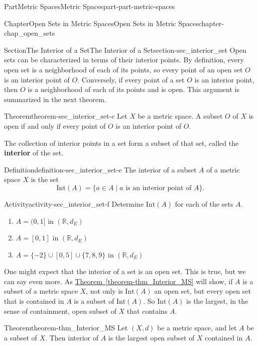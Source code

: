 \documentclass[oneside,10pt,]{book}
\newcommand{\xreffont}{\relax}
\newcommand{\terminology}[1]{\textbf{#1}}
\numberwithin{equation}{chapter}
\newcommand{\R}{\mathbb{R}}
\newcommand{\Int}{\text{Int}}
\begin{document}
\begin{partptx}{Part}{Metric Spaces}{}{Metric Spaces}{}{}{part-part-metric-spaces}
\begin{chapterptx}{Chapter}{Open Sets in Metric Spaces}{}{Open Sets in Metric Spaces}{}{}{chapter-chap_open_sets}
\begin{sectionptx}{Section}{The Interior of a Set}{}{The Interior of a Set}{}{}{section-sec_interior_set}
Open sets can be characterized in terms of their interior points. By definition, every open set is a neighborhood of each of its points, so every point of an open set \(O\) is an interior point of \(O\). Conversely, if every point of a set \(O\) is an interior point, then \(O\) is a neighborhood of each of its points and is open. This argument is summarized in the next theorem.%
\begin{theorem}{Theorem}{}{}{theorem-sec_interior_set-c}%
Let \(X\) be a metric space. A subset \(O\) of \(X\) is open if and only if every point of \(O\) is an interior point of \(O\).%
\end{theorem}
The collection of interior points in a set form a subset of that set, called the \terminology{interior} of the set.%
\begin{definition}{Definition}{}{definition-sec_interior_set-e}%
The interior  of a subset \(A\) of a metric space \(X\) is the set%
\begin{equation*}
\Int(A) = \{a \in A \mid a \text{ is an interior point of }  A\}\text{.}
\end{equation*}
%
\end{definition}
\begin{activity}{Activity}{}{activity-sec_interior_set-f}%
Determine \(\Int(A)\) for each of the sets \(A\).%
\begin{enumerate}[font=\bfseries,label=(\alph*),ref=\alph*]%
\item{}\(A = (0,1]\) in \((\R, d_E)\)%
\item{}\(A = [0,1]\) in \((\R, d_E)\)%
\item{}\(A = \{-2\} \cup [0,5] \cup \{7,8,9\}\) in \((\R,d_E)\)%
\end{enumerate}%
\end{activity}%
One might expect that the interior of a set is an open set. This is true, but we can say even more. As \hyperref[theorem-thm_Interior_MS]{Theorem~{\xreffont\ref{theorem-thm_Interior_MS}}} will show, if \(A\) is a subset of a metric space \(X\), not only is \(\Int(A)\) an open set, but every open set that is contained in \(A\) is a subset of \(\Int(A)\). So \(\Int(A)\) is the largest, in the sense of containment, open subset of \(X\) that contains \(A\).%
\begin{theorem}{Theorem}{}{}{theorem-thm_Interior_MS}%
Let \((X,d)\) be a metric space, and let \(A\) be a subset of \(X\). Then interior of \(A\) is the largest open subset of \(X\) contained in \(A\).%
\end{theorem}

\end{sectionptx}
\end{chapterptx}
\end{partptx}
\end{document}
